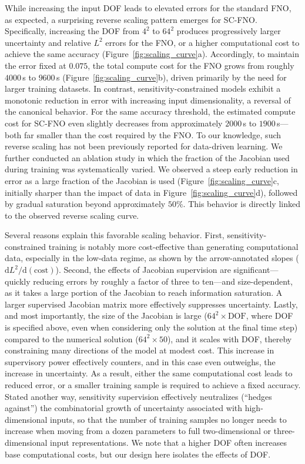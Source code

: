 While increasing the input DOF leads to elevated errors for the standard FNO, as expected, a surprising reverse scaling pattern emerges for SC-FNO. Specifically, increasing the DOF from $4^2$ to $64^2$ produces progressively larger uncertainty and relative $L^2$ errors for the FNO, or a higher computational cost to achieve the same accuracy (Figure~\ref{fig:scaling_curve}a). Accordingly, to maintain the error fixed at $0.075$, the total compute cost for the FNO grows from roughly $4000$\,s to $9600$\,s (Figure~\ref{fig:scaling_curve}b), driven primarily by the need for larger training datasets. In contrast, sensitivity-constrained models exhibit a monotonic reduction in error with increasing input dimensionality, a reversal of the canonical behavior. For the same accuracy threshold, the estimated compute cost for SC-FNO even slightly decreases from approximately $2000$\,s to $1900$\,s—both far smaller than the cost required by the FNO. To our knowledge, such reverse scaling has not been previously reported for data-driven learning. We further conducted an ablation study in which the fraction of the Jacobian used during training was systematically varied. We observed a steep early reduction in error as a large fraction of the Jacobian is used (Figure~\ref{fig:scaling_curve}c, initially sharper than the impact of data in Figure~\ref{fig:scaling_curve}d), followed by gradual saturation beyond approximately $50\%$. This behavior is directly linked to the observed reverse scaling curve.

Several reasons explain this favorable scaling behavior. First, sensitivity-constrained training is notably more cost-effective than generating computational data, especially in the low-data regime, as shown by the arrow-annotated slopes ($\mathrm{d}L^2/\mathrm{d}(\text{cost})$). Second, the effects of Jacobian supervision are significant—quickly reducing errors by roughly a factor of three to ten—and size-dependent, as it takes a large portion of the Jacobian to reach information saturation. A larger supervised Jacobian matrix more effectively suppresses uncertainty. Lastly, and most importantly, the size of the Jacobian is large ($64^2 \times \text{DOF}$, where DOF is specified above, even when considering only the solution at the final time step) compared to the numerical solution ($64^2 \times 50$), and it scales with DOF, thereby constraining many directions of the model at modest cost. This increase in supervisory power effectively counters, and in this case even outweighs, the increase in uncertainty. As a result, either the same computational cost leads to reduced error, or a smaller training sample is required to achieve a fixed accuracy. Stated another way, sensitivity supervision effectively neutralizes (``hedges against'') the combinatorial growth of uncertainty associated with high-dimensional inputs, so that the number of training samples no longer needs to increase when moving from a dozen parameters to full two-dimensional or three-dimensional input representations. We note that a higher DOF often increases base computational costs, but our design here isolates the effects of DOF.




